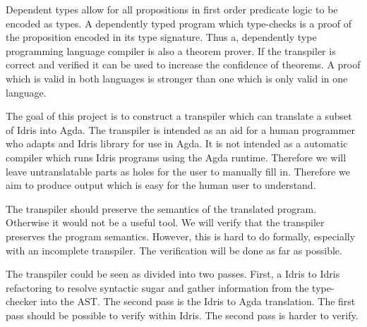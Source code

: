 Dependent types allow for all propositions in first order predicate logic to be
encoded as types. A dependently typed program which type-checks is a proof of
the proposition encoded in its type signature. Thus a, dependently type
programming language compiler is also a theorem prover. If the transpiler is correct and verified it can
be used to increase the confidence of theorems. A proof which is valid in both
languages is stronger than one which is only valid in one language.


The goal of this project is to construct a transpiler which can translate
a subset of Idris into Agda. The transpiler is intended as an aid for
a human programmer who adapts and Idris library for use in Agda.  It is not
intended as a automatic compiler which runs Idris programs using the Agda
runtime. Therefore we will leave untranslatable parts as holes for the user to
manually fill in. Therefore we aim to produce output which is easy for
the human user to understand.



The transpiler should preserve the semantics of the translated program.
Otherwise it would not be a useful tool.  We will verify that the transpiler
preserves the program semantics.  However, this is hard to do formally,
especially with an incomplete transpiler.  The verification will be done as far
as possible.


The transpiler could be seen as divided into two passes. First, a Idris to
Idris refactoring to resolve syntactic sugar and gather information from the
type-checker into the AST. The second pass is the Idris to Agda translation.
The first pass should be possible to verify within Idris. The second pass is
harder to verify.



